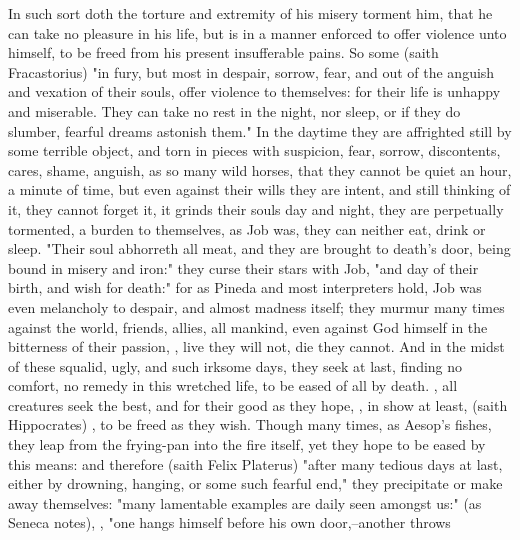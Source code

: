 In such sort doth the torture and extremity of his misery torment him, that he
can take no pleasure in his life, but is in a manner enforced to offer violence
unto himself, to be freed from his present insufferable pains. So some (saith
Fracastorius) "in fury, but most in despair, sorrow, fear,
and out of the anguish and vexation of their souls, offer violence to
themselves: for their life is unhappy and miserable. They can take no rest in
the night, nor sleep, or if they do slumber, fearful dreams astonish them." In
the daytime they are affrighted still by some terrible object, and torn in
pieces with suspicion, fear, sorrow, discontents, cares, shame, anguish, \etc{}
as so many wild horses, that they cannot be quiet an hour, a minute of time,
but even against their wills they are intent, and still thinking of it, they
cannot forget it, it grinds their souls day and night, they are perpetually
tormented, a burden to themselves, as Job was, they can neither eat, drink or
sleep.  "Their soul abhorreth all meat, and they
are brought to death's door, being bound in misery and
iron:" they curse their stars with Job,
"and day of their birth, and wish for death:" for as
Pineda and most interpreters hold, Job was even melancholy to despair, and
almost madness itself; they murmur many times against the
world, friends, allies, all mankind, even against God himself in the bitterness
of their passion, , live
they will not, die they cannot. And in the midst of these squalid, ugly, and
such irksome days, they seek at last, finding no comfort,
no remedy in this wretched life, to be eased of all by
death. , all creatures seek the best, and for their
good as they hope, , in show at least,  (saith Hippocrates) , to be freed as they wish. Though many times,
as Aesop's fishes, they leap from the frying-pan into the fire itself, yet they
hope to be eased by this means: and therefore (saith Felix
Platerus) "after many tedious days at last, either by
drowning, hanging, or some such fearful end," they precipitate or make away
themselves: "many lamentable examples are daily seen amongst us:"  (as Seneca notes), , "one hangs himself before his own door,--another throws
